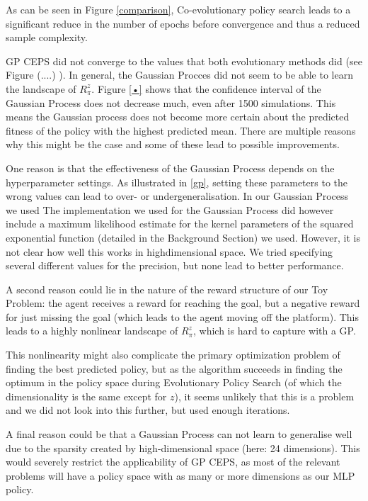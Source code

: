 As can be seen in Figure \ref{comparison}, Co-evolutionary policy search leads to a significant reduce in the number of epochs before convergence and thus a reduced sample complexity. 

GP CEPS did not converge to the values that both evolutionary methods did (see Figure (....) ). In general, the Gaussian Procces did not seem to be able to learn the landscape of $R_{\pi}^z$. Figure \ref{•} shows that the confidence interval of the Gaussian Process does not decrease much, even after 1500 simulations. This means the Gaussian process does not become more certain about the predicted fitness of the policy with the highest predicted mean.
There are multiple reasons why this might be the case and some of these lead to possible improvements. 

One reason is that the effectiveness of the Gaussian Process depends on the hyperparameter settings. As illustrated in  \ref{gp}, setting these parameters to the wrong values can lead to over- or undergeneralisation. In our Gaussian Process we used  The implementation we used for the Gaussian Process did however include a maximum likelihood estimate for the kernel parameters of the squared exponential function (detailed in the Background Section) we used. However, it is not clear how well this works in highdimensional space. We tried specifying several different values for the precision, but none lead to better performance. 

A second reason could lie in the nature of the reward   structure of our Toy Problem: the agent receives a reward for reaching the goal, but a negative reward for just missing the goal (which leads to the agent moving off the platform). This leads to a highly nonlinear landscape of $R_{\pi}^z$, which is hard to capture with a GP. 

This nonlinearity might also complicate the primary optimization problem of finding the best predicted policy, but as the algorithm succeeds in finding the optimum in the policy space during Evolutionary Policy Search (of which the dimensionality is the same except for $z$), it seems unlikely that this is a problem and we did not look into this further, but used enough iterations.

A final reason could be that a Gaussian Process can not learn to generalise well due to the sparsity created by high-dimensional space (here: 24 dimensions). This would severely restrict the applicability of GP CEPS, as most of the relevant problems will have a policy space with as many or more dimensions as our MLP policy.

